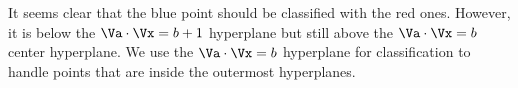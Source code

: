 \documentclass[12pt]{article}
\begin{document}
It seems clear that the blue point should be classified with the red ones. However, it is below the $\Va\cdot\Vx = b+1$ hyperplane but still above the $\Va\cdot\Vx = b$ center hyperplane. We use the $\Va\cdot\Vx = b$ hyperplane for classification to handle points that are inside the outermost hyperplanes.
	
\end{document}
